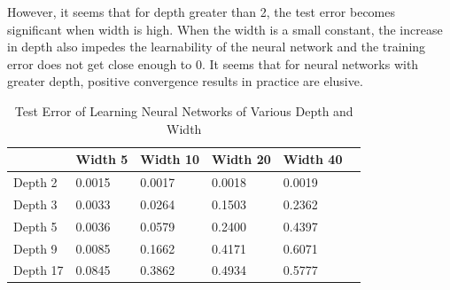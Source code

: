 However, it seems that for depth greater than 2, the test error becomes significant  when width is high. When the width is a small constant, the increase in depth also impedes the learnability of the neural network and the training error does not get close enough to 0. It seems that for neural networks with greater depth, positive convergence results in practice are elusive.
\begin{table}[tb]
\caption{Test Error of Learning Neural Networks of Various Depth and Width}
\vskip 0.1in
\begin{center}
\begin{small}
\begin{sc}
\begin{tabular}{
  |p{}|%
   |p{}|%
  |p{}%
  |p{}%
  |p{}%
   |p{}|%
  }
   \hline 
           & Width 5   &  Width 10   & Width 20 & Width 40     \\ \hline 
    Depth 2 & 0.0015   & 0.0017      &   0.0018 & 0.0019 \\ \hline
    Depth 3 & 0.0033   & 0.0264        &   0.1503 & 0.2362 \\ \hline
    Depth 5 & 0.0036   & 0.0579        &   0.2400 & 0.4397 \\ \hline
    Depth 9 & 0.0085   & 0.1662        &   0.4171 & 0.6071 \\ \hline
    Depth 17 & 0.0845   & 0.3862        &   0.4934 & 0.5777 \\ \hline
\end{tabular}
\end{sc}
\end{small}
\end{center}
\vskip -0.1in
\end{table}




